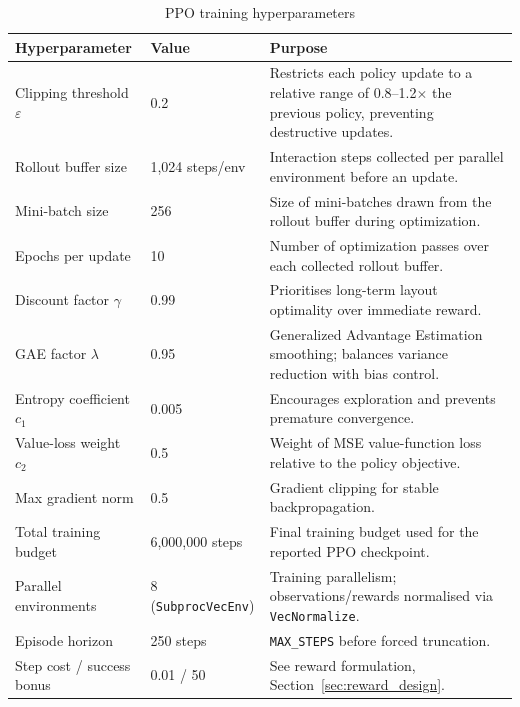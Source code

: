 \documentclass[11pt,a4paper,oneside]{report}
\begin{document}
\begin{table}[H]
\centering
\caption{PPO training hyperparameters}
\label{tab:ppo_hyper}
\begin{tabular}{|p{4.6cm}|p{2.4cm}|p{6.2cm}|}
\hline
\textbf{Hyperparameter} & \textbf{Value} & \textbf{Purpose} \\
\hline
Clipping threshold $\varepsilon$ & 0.2 & Restricts each policy update to a relative range of 0.8--1.2$\times$ the previous policy, preventing destructive updates. \\ \hline
Rollout buffer size & 1{,}024 steps/env & Interaction steps collected per parallel environment before an update. \\ \hline
Mini-batch size & 256 & Size of mini-batches drawn from the rollout buffer during optimization. \\ \hline
Epochs per update & 10 & Number of optimization passes over each collected rollout buffer. \\ \hline
Discount factor $\gamma$ & 0.99 & Prioritises long-term layout optimality over immediate reward. \\ \hline
GAE factor $\lambda$ & 0.95 & Generalized Advantage Estimation smoothing; balances variance reduction with bias control. \\ \hline
Entropy coefficient $c_1$ & 0.005 & Encourages exploration and prevents premature convergence. \\ \hline
Value-loss weight $c_2$ & 0.5 & Weight of MSE value-function loss relative to the policy objective. \\ \hline
Max gradient norm & 0.5 & Gradient clipping for stable backpropagation. \\ \hline
Total training budget & 6{,}000{,}000 steps & Final training budget used for the reported PPO checkpoint. \\ \hline
Parallel environments & 8 (\texttt{SubprocVecEnv}) & Training parallelism; observations/rewards normalised via \texttt{VecNormalize}. \\ \hline
Episode horizon & 250 steps & \texttt{MAX\_STEPS} before forced truncation. \\ \hline
Step cost / success bonus & 0.01 / 50 & See reward formulation, Section~\ref{sec:reward_design}. \\
\hline
\end{tabular}
\end{table}
\end{document}

